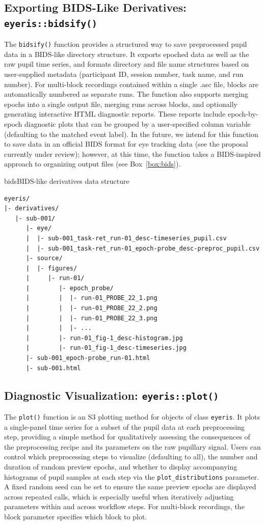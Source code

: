 \subsection{Exporting BIDS-Like Derivatives: \texttt{eyeris::bidsify()}}
The \texttt{bidsify()} function provides a structured way to save preprocessed pupil data in a BIDS-like directory structure. It exports epoched data as well as the raw pupil time series, and formats directory and file name structures based on user-supplied metadata (participant ID, session number, task name, and run number). For multi-block recordings contained within a single .asc file, blocks are automatically numbered as separate runs. The function also supports merging epochs into a single output file, merging runs across blocks, and optionally generating interactive HTML diagnostic reports. These reports include epoch-by-epoch diagnostic plots that can be grouped by a user-specified column variable (defaulting to the matched event label). In the future, we intend for this function to save data in an official BIDS format for eye tracking data (see the proposal currently under review); however, at this time, the function takes a BIDS-inspired approach to organizing output files (see Box~\ref{box:bids}).

\begin{eyerisbox}{bids}{BIDS-like derivatives data structure}
\begin{verbatim}
eyeris/
|- derivatives/
   |- sub-001/
      |- eye/
      |  |- sub-001_task-ret_run-01_desc-timeseries_pupil.csv
      |  |- sub-001_task-ret_run-01_epoch-probe_desc-preproc_pupil.csv
      |- source/
      |  |- figures/
      |     |- run-01/
      |        |- epoch_probe/
      |        |  |- run-01_PROBE_22_1.png
      |        |  |- run-01_PROBE_22_2.png
      |        |  |- run-01_PROBE_22_3.png
      |        |  |- ...
      |        |- run-01_fig-1_desc-histogram.jpg
      |        |- run-01_fig-1_desc-timeseries.jpg
      |- sub-001_epoch-probe_run-01.html
      |- sub-001.html
\end{verbatim}
\end{eyerisbox}

\subsection{Diagnostic Visualization: \texttt{eyeris::plot()}}
The \texttt{plot()} function is an S3 plotting method for objects of class \texttt{eyeris}. It plots a single-panel time series for a subset of the pupil data at each preprocessing step, providing a simple method for qualitatively assessing the consequences of the preprocessing recipe and its parameters on the raw pupillary signal. Users can control which preprocessing steps to visualize (defaulting to all), the number and duration of random preview epochs, and whether to display accompanying histograms of pupil samples at each step via the \texttt{plot\_distributions} parameter. A fixed random seed can be set to ensure the same preview epochs are displayed across repeated calls, which is especially useful when iteratively adjusting parameters within and across workflow steps. For multi-block recordings, the block parameter specifies which block to plot.

